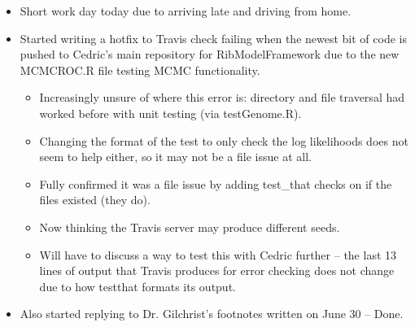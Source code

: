 \documentclass[12pt,hyperref]{labbook}
\begin{document}
\begin{itemize}
    \item Short work day today due to arriving late and driving from home.
    \item Started writing a hotfix to Travis check failing when the newest bit of code is pushed to Cedric's main repository for RibModelFramework due to the new MCMCROC.R file testing MCMC functionality.
    \begin{itemize}
        \item Increasingly unsure of where this error is: directory and file traversal had worked before with unit testing (via testGenome.R).
        \item Changing the format of the test to only check the log likelihoods does not seem to help either, so it may not be a file issue at all.
        \item Fully confirmed it was a file issue by adding test\_that checks on if the files existed (they do).
        \item Now thinking the Travis server may produce different seeds.
        \item Will have to discuss a way to test this with Cedric further -- the last 13 lines of output that Travis produces for error checking does not change due to how testthat formats its output.
    \end{itemize}
    \item Also started replying to Dr. Gilchrist's footnotes written on June 30 -- Done.
\end{itemize}

\end{document}

